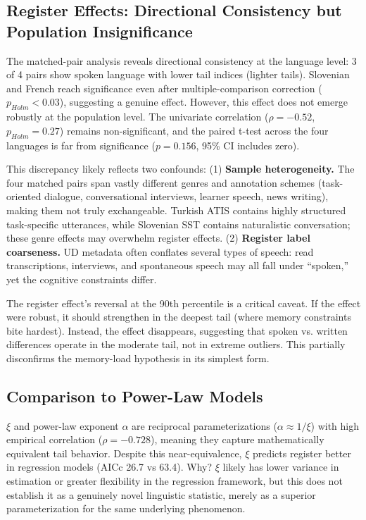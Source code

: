 \documentclass[11pt,letterpaper]{article}
\begin{document}
\subsection{Register Effects: Directional Consistency but Population Insignificance}

The matched-pair analysis reveals directional consistency at the language level: 3 of 4 pairs show spoken language with lower tail indices (lighter tails). Slovenian and French reach significance even after multiple-comparison correction ($p_{Holm}<0.03$), suggesting a genuine effect. However, this effect does not emerge robustly at the population level. The univariate correlation ($\rho=-0.52$, $p_{Holm}=0.27$) remains non-significant, and the paired t-test across the four languages is far from significance ($p=0.156$, 95\% CI includes zero).

This discrepancy likely reflects two confounds: (1) \textbf{Sample heterogeneity.} The four matched pairs span vastly different genres and annotation schemes (task-oriented dialogue, conversational interviews, learner speech, news writing), making them not truly exchangeable. Turkish ATIS contains highly structured task-specific utterances, while Slovenian SST contains naturalistic conversation; these genre effects may overwhelm register effects. (2) \textbf{Register label coarseness.} UD metadata often conflates several types of speech: read transcriptions, interviews, and spontaneous speech may all fall under ``spoken,'' yet the cognitive constraints differ.

The register effect's reversal at the 90th percentile is a critical caveat. If the effect were robust, it should strengthen in the deepest tail (where memory constraints bite hardest). Instead, the effect disappears, suggesting that spoken vs. written differences operate in the moderate tail, not in extreme outliers. This partially disconfirms the memory-load hypothesis in its simplest form.

\subsection{Comparison to Power-Law Models}

$\xi$ and power-law exponent $\alpha$ are reciprocal parameterizations ($\alpha \approx 1/\xi$) with high empirical correlation ($\rho=-0.728$), meaning they capture mathematically equivalent tail behavior. Despite this near-equivalence, $\xi$ predicts register better in regression models (AICc 26.7 vs 63.4). Why? $\xi$ likely has lower variance in estimation or greater flexibility in the regression framework, but this does not establish it as a genuinely novel linguistic statistic, merely as a superior parameterization for the same underlying phenomenon.
\end{document}
